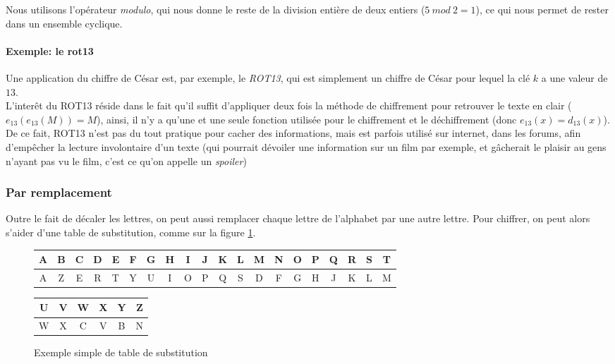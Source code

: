 
Nous utilisons l'opérateur \emph{modulo}, qui nous donne le reste de
la division entière de deux entiers ($5~ mod~ 2 = 1$), ce qui nous
permet de rester dans un ensemble cyclique. \\

\paragraph{Exemple: le rot13\label{syst:rot13}}
Une application du chiffre de César est, par exemple, le \emph{ROT13},
qui est simplement un chiffre de César pour lequel la clé $k$ a une
valeur de $13$.\\

L'interêt du ROT13 réside dans le fait qu'il suffit d'appliquer deux
fois la méthode de chiffrement pour retrouver le texte en clair
($e_{13}(e_{13}(M)) = M$), ainsi, il n'y a qu'une et une seule fonction utilisée
pour le chiffrement et le déchiffrement (donc $e_{13}(x) =
d_{13}(x)$). \\

De ce fait, ROT13 n'est pas du tout pratique pour cacher des
informations, mais est parfois utilisé sur internet, dans les forums,
afin d'empêcher la lecture involontaire d'un texte (qui pourrait
dévoiler une information sur un film par exemple, et gâcherait le
plaisir au gens n'ayant pas vu le film, c'est ce qu'on appelle un 
\emph{spoiler}) 

\subsubsection{Par remplacement}
Outre le fait de décaler les lettres, on peut aussi remplacer chaque
lettre de l'alphabet par une autre lettre. Pour chiffrer, on peut alors
s'aider d'une table de substitution, comme sur la figure
\ref{fig:SubstitutionSimple}.

 \begin{figure}[h]
   \begin{center}
    \begin{tabular}{|c|c|c|c|c|c|c|c|c|c|c|c|c|c|c|c|c|c|c|c}
      \hline
      A & B & C & D & E & F & G & H & I & J & K & L & M & N & O & P &
      Q & R & S & T \\
      \hline
      A & Z & E & R & T & Y & U & I & O & P & Q & S & D & F & G & H &
      J & K & L & M \\
      \hline
    \end{tabular}
  \end{center}
  \begin{flushright}
    \begin{tabular}{c|c|c|c|c|c|}
      \hline
      U & V & W & X & Y & Z \\
      \hline
      W & X & C & V & B & N \\
      \hline
    \end{tabular}
  \end{flushright}
  \caption{Exemple simple de table de substitution}
  \label{fig:SubstitutionSimple}
\end{figure}

